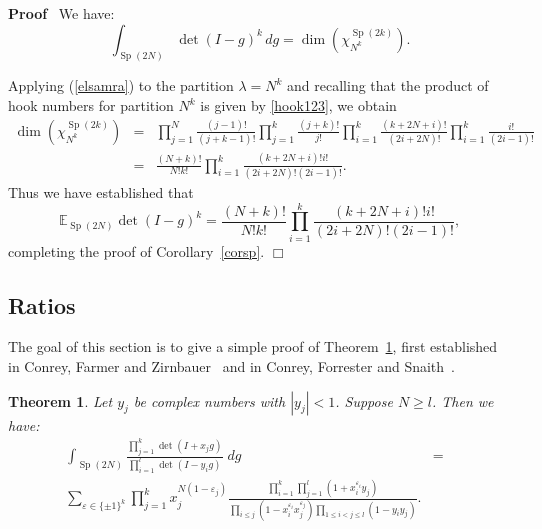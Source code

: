 \documentclass[11pt]{amsart}
\newcommand{\tmop}[1]{\ensuremath{\operatorname{#1}}}
\renewenvironment{proof}{
\noindent\textbf{Proof}\ }{\hspace*{\fill}
\begin{math}\Box\end{math}\medskip}
\newtheorem{theorem}{Theorem}
\begin{document}
\begin{proof}
  We have:
  \begin{equation}
    \int_{\tmop{Sp} ( 2 N )} \det ( I - g )^k \, d g = \dim (
    \chi_{N^k}^{\tmop{Sp} ( 2 k )} ) .
  \end{equation}


  Applying (\ref{elsamra}) to the partition $\lambda = N^k$ and recalling that
  the product of hook numbers for partition $N^k$ is given by
  \eqref{hook123}, we obtain
  \begin{eqnarray*}
    \dim ( \chi_{N^k}^{\tmop{Sp} ( 2 k )} ) & = & \prod_{j = 1}^N \frac{( j -
    1 ) !}{( j + k - 1 ) !} \prod_{j = 1}^k \frac{( j + k ) !}{j!} \prod_{i =
    1}^k \frac{( k + 2 N + i ) !}{( 2 i + 2 N ) !} \prod_{i = 1}^k \frac{i!}{(
    2 i - 1 ) !}\\
    & = & \frac{( N + k ) !}{N!k!} \prod_{i = 1}^k \frac{( k + 2 N + i )
    !i!}{( 2 i + 2 N ) ! ( 2 i - 1 ) !} .
  \end{eqnarray*}
  Thus we have established that
  \[ \mathbb{E}_{\tmop{Sp} ( 2 N )} \det ( I - g )^k = \frac{( N + k )
     !}{N!k!} \prod_{i = 1}^k \frac{( k + 2 N + i ) !i!}{( 2 i + 2 N ) ! ( 2 i
     - 1 ) !}, \]
  completing the proof of Corollary~\ref{corsp}.
\end{proof}

\subsection{Ratios}

The goal of this section is to give a simple proof of
Theorem~\ref{ratsp}, first established in Conrey, Farmer and
Zirnbauer~{\cite{cfz}} and in Conrey, Forrester and
Snaith~{\cite{cfs}}.




\begin{theorem}
  \label{ratsp}  Let $y_j$ be complex numbers with $|y_j| < 1$.
  Suppose $N \geqslant l$. Then we have:
  \begin{eqnarray*}
    \int_{\tmop{Sp} ( 2 N )} \frac{\prod_{j = 1}^k \det ( I + x_j g
    )}{\prod_{i = 1}^l \det ( I - y_i g )} \; d g & = & \\
    \sum_{\varepsilon \in \{ \pm 1 \}^k} \prod_{j = 1}^k x_j^{N ( 1 -
    \varepsilon_j )} \frac{\prod_{i = 1}^k \prod_{j = 1}^l ( 1 +
    x_i^{\varepsilon_i} y_j )}{\prod_{i \leqslant j} ( 1 - x_i^{\varepsilon_i}
    x_j^{\varepsilon_j} ) \prod_{1 \leqslant i < j \leqslant l} ( 1 - y_i y_j
    )} . &  &
  \end{eqnarray*}

\end{theorem}
\end{document}
